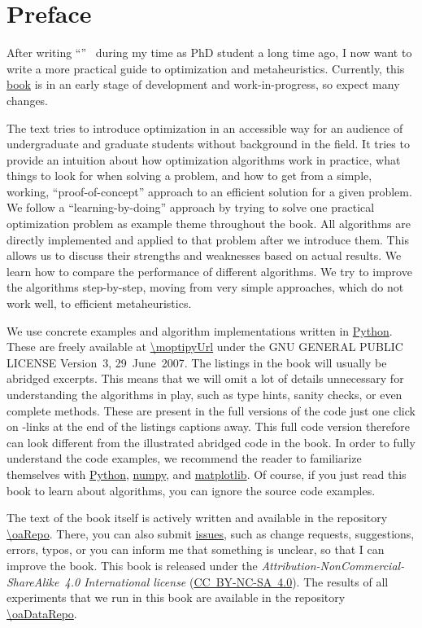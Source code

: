 \chapter*{Preface}%
%
%
After writing ``''~\cite{W2009GOATAA} during my time as PhD student a long time ago, I now want to write a more practical guide to optimization and metaheuristics.
Currently, this \href{\oaUrl/index.html}{book} is in an early stage of development and work-in-progress, so expect many changes.

The text tries to introduce optimization in an accessible way for an audience of undergraduate and graduate students without background in the field.
It tries to provide an intuition about how optimization algorithms work in practice, what things to look for when solving a problem, and how to get from a simple, working, ``proof-of-concept'' approach to an efficient solution for a given problem.
We follow a ``learning-by-doing'' approach by trying to solve one practical optimization problem as example theme throughout the book.
All algorithms are directly implemented and applied to that problem after we introduce them.
This allows us to discuss their strengths and weaknesses based on actual results.
We learn how to compare the performance of different algorithms.
We try to improve the algorithms step-by-step, moving from very simple approaches, which do not work well, to efficient metaheuristics.

We use concrete examples and algorithm implementations written in \href{https://python.org}{Python}.
These are freely available at \url{\moptipyUrl} under the GNU GENERAL PUBLIC LICENSE Version~3, 29~June~2007.
The listings in the book will usually be abridged excerpts.
This means that we will omit a lot of details unnecessary for understanding the algorithms in play, such as type hints, sanity checks, or even complete methods.
These are present in the full versions of the code just one click on -links at the end of the listings captions away.
This full code version therefore can look different from the illustrated abridged code in the book.
In order to fully understand the code examples, we recommend the reader to familiarize themselves with \href{https://python.org}{Python}, \href{https://numpy.org/}{numpy}, and \href{https://matplotlib.org/}{matplotlib}.
Of course, if you just read this book to learn about algorithms, you can ignore the source code examples. 

The text of the book itself is actively written and available in the repository \url{\oaRepo}.
There, you can also submit \href{\oaRepo/issues}{issues}, such as change requests, suggestions, errors, typos, or you can inform me that something is unclear, so that I can improve the book. 
This book is released under the \emph{Attribution-NonCommercial-ShareAlike~4.0 International license} (\href{http://creativecommons.org/licenses/by-nc-sa/4.0/}{\mbox{CC~BY-NC-SA~4.0}}).
The results of all experiments that we run in this book are available in the repository \url{\oaDataRepo}.

